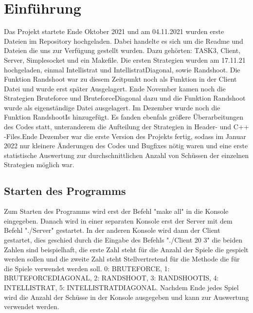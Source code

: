 \section*{Einführung}

Das Projekt startete Ende Oktober 2021 und am 04.11.2021 wurden erste Dateien im Repository hochgeladen.\newline
Dabei handelte es sich um die Readme und Dateien die uns zur Verfügung gestellt wurden.
Dazu gehörten: TASK3, Client, Server, Simplesocket und ein Makefile.\newline
\newline
Die ersten Strategien wurden am 17.11.21 hochgeladen, einmal Intellistrat und \newline IntellistratDiagonal, sowie Randshoot.
Die Funktion Randshoot war zu diesem Zeitpunkt noch als Funktion in der Client Datei und wurde erst später Ausgelagert.\newline
\newline
Ende November kamen noch die Strategien Bruteforce und BruteforceDiagonal dazu und die Funktion Randshoot wurde als eigenständige Datei ausgelagert.\newline
\newline
Im Dezember wurde noch die Funktion RandshootIs hinzugefügt. Es fanden ebenfals größere Überarbeitungen des Codes statt, unteranderem die Aufteilung der Strategien in Header- und C++ -Files.\newline Ende Dezember war die erste Version des Projekts fertig, sodass im Januar 2022 nur kleinere Änderungen des Codes und Bugfixes nötig waren und eine erste statistische Auswertung zur durchschnittlichen Anzahl von Schüssen der einzelnen Strategien möglich war. 

\subsection*{Starten des Programms}
Zum Starten des Programms wird erst der Befehl "make all" in die Konsole eingegeben. Danach wird in einer separaten Konsole erst der Server mit dem Befehl "./Server" gestartet. In der anderen Konsole wird dann der Client gestartet, dies geschied durch die Eingabe des Befehls "./Client 20 3" die beiden Zahlen sind beispielhaft, die erste Zahl steht für die Anzahl der Spiele die gespielt werden sollen und die zweite Zahl steht Stellvertretend für die Methode die für die Spiele verwendet werden soll. 0: BRUTEFORCE, 1: BRUTEFORCEDIAGONAL, 2: RANDSHOOT, 3: RANDSHOOTIS, 4: INTELLISTRAT, 5: INTELLISTRATDIAGONAL. Nachdem Ende jedes Spiel wird die Anzahl der Schüsse in der Konsole ausgegeben und kann zur Auswertung verwendet werden.


